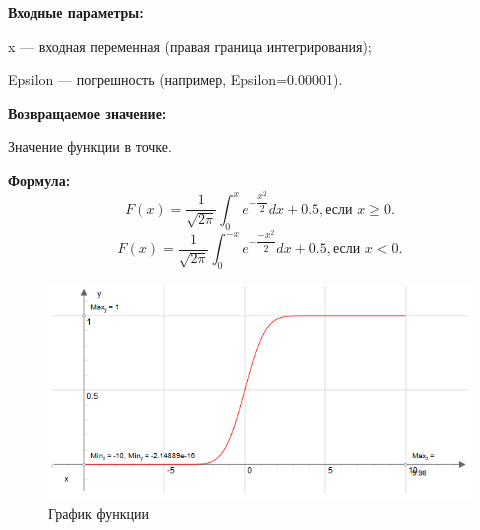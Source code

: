 \textbf{Входные параметры:}

 x --- входная переменная (правая граница интегрирования);
 
 Epsilon --- погрешность (например, Epsilon=0.00001).

\textbf{Возвращаемое значение:}

 Значение функции в точке.
 
\textbf{Формула:}
\begin{equation*}
F\left(x \right)=\dfrac{1}{\sqrt{2\pi}}\int_0^x {e^{-\dfrac{x^2}{2}}dx}+0.5, \text{если } x \geq 0.
\end{equation*}
\begin{equation*}
F\left(x \right)=\dfrac{1}{\sqrt{2\pi}}\int_0^{-x} {e^{-\dfrac{-x^2}{2}}dx}+0.5, \text{если } x < 0.
\end{equation*}

 \begin{figure} [h] 
   \center
   \includegraphics {HML_DistributionFunctionOfNormalizedCenteredNormalDistribution_Graph.png}
   \caption{График функции} 
   \label{img:HML_DistributionFunctionOfNormalizedCenteredNormalDistribution_Graph}  
 \end{figure}
 
